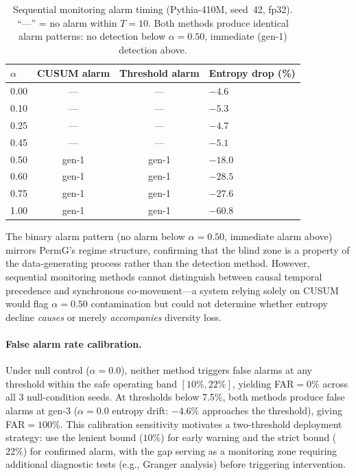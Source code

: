 \begin{table}[t]
\centering
\small
\caption{Sequential monitoring alarm timing (Pythia-410M, seed~42, fp32). ``---'' = no alarm within $T{=}10$. Both methods produce identical alarm patterns: no detection below $\alpha{=}0.50$, immediate (gen-1) detection above.}
\label{tab:sequential_timing}
\begin{tabular}{lccl}
\toprule
$\alpha$ & CUSUM alarm & Threshold alarm & Entropy drop (\%) \\
\midrule
0.00 & --- & --- & $-4.6$ \\
0.10 & --- & --- & $-5.3$ \\
0.25 & --- & --- & $-4.7$ \\
0.45 & --- & --- & $-5.1$ \\
0.50 & gen-1 & gen-1 & $-18.0$ \\
0.60 & gen-1 & gen-1 & $-28.5$ \\
0.75 & gen-1 & gen-1 & $-27.6$ \\
1.00 & gen-1 & gen-1 & $-60.8$ \\
\bottomrule
\end{tabular}
\end{table}

The binary alarm pattern (no alarm below $\alpha{=}0.50$, immediate alarm above) mirrors PermG's regime structure, confirming that the blind zone is a property of the data-generating process rather than the detection method.
However, sequential monitoring methods cannot distinguish between causal temporal precedence and synchronous co-movement---a system relying solely on CUSUM would flag $\alpha{=}0.50$ contamination but could not determine whether entropy decline \emph{causes} or merely \emph{accompanies} diversity loss.

\paragraph{False alarm rate calibration.}
Under null control ($\alpha{=}0.0$), neither method triggers false alarms at any threshold within the safe operating band $[10\%, 22\%]$, yielding FAR${=}0\%$ across all 3 null-condition seeds.
At thresholds below 7.5\%, both methods produce false alarms at gen-3 ($\alpha{=}0.0$ entropy drift: $-4.6\%$ approaches the threshold), giving FAR${=}100\%$.
This calibration sensitivity motivates a two-threshold deployment strategy: use the lenient bound ($10\%$) for early warning and the strict bound ($22\%$) for confirmed alarm, with the gap serving as a monitoring zone requiring additional diagnostic tests (e.g., Granger analysis) before triggering intervention.

